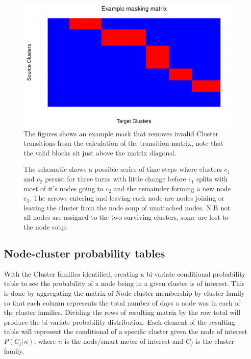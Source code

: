 \begin{figure}
    \centering
    \includegraphics[width = \textwidth]{Figures/Method/ClusterMask}
    \caption[Cluster Transition Mask]{The figures shows an example mask that removes invalid Cluster transitions from the calculation of the transition matrix, note that the valid blocks sit just above the matrix diagonal. }
    \label{fig:ClusterMask}
\end{figure}

\begin{figure}[ht]
\centering
  
  \caption[Cluster Continuation. Merge and Split]{The schematic shows a possible series of time steps where clusters $c_1$ and $c_2$ persist for three turns with little change before $c_1$ splits with most of it's nodes going to $c_2$ and the remainder forming a new node $c_3$. The arrows entering and leaving each node are nodes joining or leaving the cluster from the node soup of unattached nodes. N.B not all nodes are assigned to the two surviving clusters, some are lost to the node soup.}
  \label{fig:contmergsplit}
\end{figure}


\subsection{Node-cluster probability tables}
\label{sec:NodeClustProb}

With the Cluster families identified, creating a bi-variate conditional probability table to see the probability of a node being in a given cluster is of interest.  This is done by aggregating the matrix of Node cluster membership by cluster family so that each column represents the total number of days a node was in each of the cluster families. Dividing the rows of resulting matrix by the row total will produce the bi-variate probability distribution. Each element of the resulting table will represent the conditional of a specific cluster given the node of interest $P(C_f|n)$, where $n$ is the node/smart meter of interest and $C_f$ is the cluster family.

